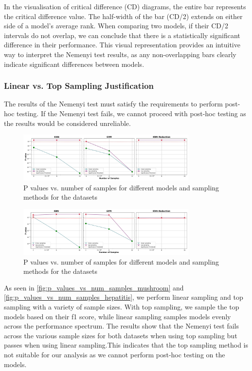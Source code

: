 In the visualisation of critical difference (CD) diagrams, the entire bar represents the critical difference value.
The half-width of the bar (CD/2) extends on either side of a model's average rank. When comparing two models,
if their CD/2 intervals do not overlap, we can conclude that there is a statistically significant difference in their performance.
This visual representation provides an intuitive way to interpret the Nemenyi test results, as any
non-overlapping bars clearly indicate significant differences between models.

\subsubsection{Linear vs. Top Sampling Justification}
The results of the Nemenyi test must satisfy the requirements to perform post-hoc testing.
If the Nemenyi test fails, we cannot proceed with post-hoc testing as the results would be considered unreliable.

\begin{figure}[!ht]
    \centering
    \includegraphics[width=0.8\textwidth]{figures/p_values_vs_num_samples_mushroom.png}
    \caption{P values vs. number of samples for different models and sampling methods for the datasets}
\label{fig:p_values_vs_num_samples_mushroom}
\end{figure}

\begin{figure}[!ht]
    \centering
    \includegraphics[width=0.8\textwidth]{figures/p_values_vs_num_samples_hepatitis.png}
    \caption{P values vs. number of samples for different models and sampling methods for the datasets}
\label{fig:p_values_vs_num_samples_hepatitis}
\end{figure}

As seen in \autoref{fig:p_values_vs_num_samples_mushroom} and \autoref{fig:p_values_vs_num_samples_hepatitis}, we perform linear sampling and top sampling with a variety
of sample sizes. With top sampling, we sample the top models based on their f1 score, while linear sampling samples models
evenly across the performance spectrum. The results show that the Nemenyi test fails across the various sample sizes for both datasets
when using top sampling but passes when using linear sampling.This indicates that the top sampling method is not suitable for our analysis
as we cannot perform post-hoc testing on the models.

